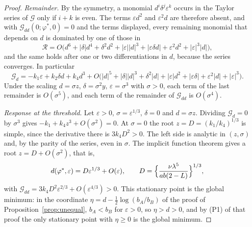 \begin{proof}
\textit{Remainder.} By the symmetry, a monomial $d^i\delta^j\varepsilon^k$ occurs in the Taylor series of $\mathcal G$ only if $i+k$ is even. The terms $\varepsilon d^2$ and $\varepsilon^2d$ are therefore absent, and with $\mathcal G_{dd}(0;\varphi^*,0)=0$ and the terms displayed, every remaining monomial that depends on $d$ is dominated by one of those in
\[
\mathcal R=O\bigl(d^6+|\delta|d^4+\delta^2d^2+|\varepsilon||d|^3+|\varepsilon\delta d|+\varepsilon^2d^2+|\varepsilon|^3|d|\bigr),
\]
and the same holds after one or two differentiations in $d$, because the series converges. In particular
\[
\mathcal G_d=-k_1\varepsilon+k_2\delta d+k_4d^3
+O\bigl(|d|^5+|\delta||d|^3+\delta^2|d|+|\varepsilon|d^2+|\varepsilon\delta|+\varepsilon^2|d|+|\varepsilon|^3\bigr).
\]
Under the scaling $d=\sigma z$, $\delta=\sigma^2y$, $\varepsilon=\sigma^3$ with $\sigma>0$, each term of the last remainder is $O(\sigma^5)$, and each term of the remainder of $\mathcal G_{dd}$ is $O(\sigma^4)$.

\textit{Response at the threshold.} Let $\varepsilon>0$, $\sigma=\varepsilon^{1/3}$, $\delta=0$ and $d=\sigma z$. Dividing $\mathcal G_d=0$ by $\sigma^3$ gives $-k_1+k_4z^3+O(\sigma^2)=0$. At $\sigma=0$ the root $z=D=(k_1/k_4)^{1/3}$ is simple, since the derivative there is $3k_4D^2>0$. The left side is analytic in $(z,\sigma)$ and, by the parity of the series, even in $\sigma$. The implicit function theorem gives a root $z=D+O(\sigma^2)$, that is,
\[
d(\varphi^*,\varepsilon)=D\varepsilon^{1/3}+O(\varepsilon),\qquad
D=\Bigl\{\frac{\nu\lambda^5}{ab(2-L)}\Bigr\}^{1/3},
\]
with $\mathcal G_{dd}=3k_4D^2\varepsilon^{2/3}+O(\varepsilon^{4/3})>0$. This stationary point is the global minimum: in the coordinate $\eta=d-\tfrac12\log(b_A/b_B)$ of the proof of Proposition~\ref{prop:unequal}, $b_A<b_B$ for $\varepsilon>0$, so $\eta>d>0$, and by (P1) of that proof the only stationary point with $\eta\ge0$ is the global minimum.


\end{proof}
